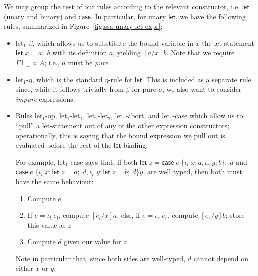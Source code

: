 \documentclass[acmsmall,screen,review]{acmart}
\newcommand{\ms}[1]{\ensuremath{\mathsf{#1}}}
\newcommand{\lto}{:}
\newcommand{\linl}[1]{\iota_l\;{#1}}
\newcommand{\linr}[1]{\iota_r\;{#1}}
\newcommand{\letexpr}[3]{\ensuremath{\ms{let}\;#1 = #2;\;#3}}
\newcommand{\caseexpr}[5]{\ms{case}\;#1\;\{\linl{#2} \lto #3, \linr{#4} \lto #5\}}
\newcommand{\hasty}[4]{#1 \vdash_{#2} #3: {#4}}
\newcommand{\brle}[1]{{\textsf{#1}}}
\begin{document}
We may group the rest of our rules according to the relevant constructor, i.e. $\ms{let}$ (unary and
binary) and $\ms{case}$. In particular, for unary $\ms{let}$, we have the following rules,
summarized in Figure~\ref{fig:ssa-unary-let-expr}:
\begin{itemize}
  \item \brle{let$_1$-$\beta$}, which allows us to substitute the bound variable in $x$ the
  let-statement $\letexpr{x}{a}{b}$ with its definition $a$, yielding $[a/x]b$. Note that we require
  $\hasty{\Gamma}{\bot}{a}{A}$; i.e., $a$ must be \emph{pure}.

  \item \brle{let$_1$-$\eta$}, which is the standard $\eta$-rule for \ms{let}. This is included as a
  separate rule since, while it follows trivially from $\beta$ for pure $a$, we also want to
  consider \emph{impure} expressions.
  
  \item Rules \brle{let$_1$-op}, \brle{let$_1$-let$_1$}, \brle{let$_1$-let$_2$},
  \brle{let$_1$-abort}, and \brle{let$_1$-case} which allow us to ``pull'' a let-statement out of
  any of the other expression constructors; operationally, this is saying that the bound expression
  we pull out is evaluated before the rest of the \ms{let}-binding.
  
  For example, \brle{let$_1$-case} says that, if both
  $\letexpr{z}{\caseexpr{e}{x}{a}{y}{b}}{d}$ and
  $\caseexpr{e}{x}{\letexpr{z}{a}{d}}{y}{\letexpr{z}{b}{d}}{y}$,
  are well typed, then both must have the same behaviour:
  \begin{enumerate}
    \item Compute $e$
    \item If $e = \linl{e_l}$, compute $[e_l/x]a$, else, if $e = \linr{e_r}$, compute $[e_r/y]b$;
          store this value as $z$
    \item Compute $d$ given our value for $z$
  \end{enumerate}
  Note in particular that, since both sides are well-typed, $d$ cannot depend on either $x$ or $y$.
\end{itemize}
\end{document}
